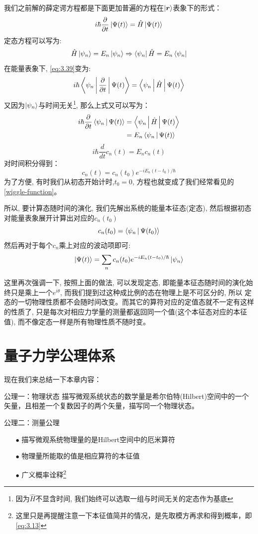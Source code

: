 \documentclass[a4paper,zihao=-4,linespread=1]{ctexrep}
\newenvironment{lequation}{\large\begin{equation}}{\end{equation}}
\begin{document}
    我们之前解的薛定谔方程都是下面更加普遍的方程在$\ket{\bm{r}}$表象下的形式：
    \begin{lequation}
        \label{eq:3.39}
        i\hbar\frac{\partial}{\partial t}\ket{\Psi(t)}=\hat{H}\ket{\Psi(t)}
    \end{lequation}
    定态方程可以写为:
    \begin{lequation}
        \hat{H}\ket{\psi_n}=E_n\ket{\psi_n}\Rightarrow\bra{\psi_n}\hat{H}=E_n\bra{\psi_n}
    \end{lequation}
    在能量表象下, \ref{eq:3.39}变为:
    \[i\hbar\Braket{\psi_n|\frac{\partial}{\partial t}|\Psi(t)}=\Braket{\psi_n|\hat{H}|\Psi(t)}\]
    又因为$\ket{\psi_n}$与时间无关\footnote{因为$\hat H$不显含时间, 我们始终可以选取一组与时间无关的定态作为基底}, 那么上式又可以写为：
    \begin{align*}
        i\hbar\frac{\partial}{\partial t}\Braket{\psi_n|\Psi(t)}&=\Braket{\psi_n|\hat{H}|\Psi(t)}\\
        &=E_n\Braket{\psi_n|\Psi(t)}
    \end{align*}
    \[i\hbar\frac{d}{dt}c_n(t)=E_n c_n(t)\]
    对时间积分得到：
    \[c_n(t)=c_n(t_0)e^{-iE_n(t-t_0)/\hbar}\]
    为了方便, 有时我们从初态开始计时,$t_0=0$, 方程也就变成了我们经常看见的\ref{wiggle-function}。

    所以, 要计算态随时间的演化, 我们先解出系统的能量本征态(定态), 然后根据初态对能量表象展开计算出对应的$c_n(t_0)$
    $$c_n(t_0)=\Braket{\psi_n|\Psi(t_0)}$$
    然后再对于每个$c_n$乘上对应的波动项即可:
    \begin{equation}
        \ket{\Psi(t)}=\sum_n c_n(t_0)e^{-iE_n(t-t_0)/\hbar}\ket{\psi_n}
    \end{equation}

    这里再次强调一下, 按照上面的做法, 可以发现定态, 即能量本征态随时间的演化始终只是乘上一个$e^{i\theta}$, 而我们提到过这种成比例的态在物理上是不可区分的, 所以
    定态的一切物理性质都不会随时间改变。而其它的算符对应的定值态就不一定有这样的性质了, 只是每次对相应力学量的测量都返回同一个值(这个本征态对应的本征值), 而不像定态一样是所有物理性质不随时变。

	\section{量子力学公理体系}
	现在我们来总结一下本章内容：
	\begin{theorem}{公理一：物理状态}
		描写微观系统状态的数学量是希尔伯特(Hilbert)空间中的一个矢量，且相差一个复数因子的两个矢量，描写同一个物理状态。
	\end{theorem}
	\begin{theorem}{公理二：测量公理}
		\begin{itemize}
			\item [$\bullet$] 描写微观系统物理量的是Hilbert空间中的厄米算符
			\item [$\bullet$] 物理量所能取的值是相应算符的本征值
			\item [$\bullet$] 广义概率诠释\footnote{这里只是再提醒注意一下本征值简并的情况，是先取模方再求和得到概率，即\ref{eq:3.13}}
		\end{itemize}
	\end{theorem}
\end{document}
